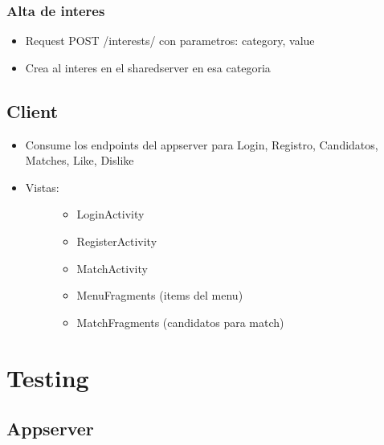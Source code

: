 \documentclass[letterpaper,10pt,english]{sphinxmanual}
\begin{document}
\subsubsection{Alta de interes}
\label{manuals:alta-de-interes}\begin{itemize}
\item {} 
Request POST /interests/ con parametros: category, value

\item {} 
Crea al interes en el sharedserver en esa categoria

\end{itemize}


\subsection{Client}
\label{manuals:client}\begin{itemize}
\item {} 
Consume los endpoints del appserver para Login, Registro, Candidatos, Matches, Like, Dislike

\item {} \begin{description}
\item[{Vistas:}] \leavevmode\begin{itemize}
\item {} 
LoginActivity

\item {} 
RegisterActivity

\item {} 
MatchActivity

\item {} 
MenuFragments (items del menu)

\item {} 
MatchFragments (candidatos para match)

\end{itemize}

\end{description}

\end{itemize}


\section{Testing}
\label{manuals:testing}

\subsection{Appserver}
\label{manuals:id1}
\end{document}
